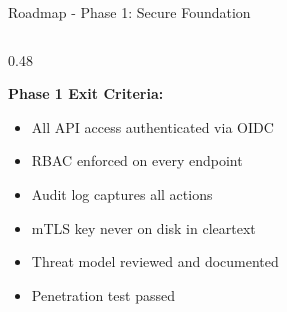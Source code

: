 \begin{frame}{Roadmap - Phase 1: Secure Foundation}
\begin{columns}[T]
\begin{column}{0.48\textwidth}
      \vspace{0.1cm}

      \textbf{Phase 1 Exit Criteria:}
      \begin{itemize}
        \setlength{\itemsep}{0pt}
        \item All API access authenticated via OIDC
        \item RBAC enforced on every endpoint
        \item Audit log captures all actions
        \item mTLS key never on disk in cleartext
        \item Threat model reviewed and documented
        \item Penetration test passed
      \end{itemize}
    \end{column}
  \end{columns}
\end{frame}

